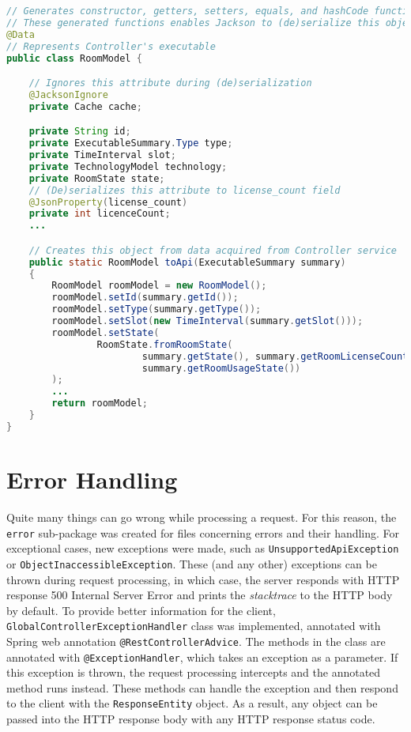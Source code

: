\begin{lstlisting}[language=java, caption=RoomModel.java, label=lst:model]
// Generates constructor, getters, setters, equals, and hashCode functions
// These generated functions enables Jackson to (de)serialize this object
@Data
// Represents Controller's executable
public class RoomModel {

    // Ignores this attribute during (de)serialization
    @JacksonIgnore
    private Cache cache;

    private String id;
    private ExecutableSummary.Type type;
    private TimeInterval slot;
    private TechnologyModel technology;
    private RoomState state;
    // (De)serializes this attribute to license_count field
    @JsonProperty(license_count)
    private int licenceCount;
    ...

    // Creates this object from data acquired from Controller service
    public static RoomModel toApi(ExecutableSummary summary)
    {
        RoomModel roomModel = new RoomModel();
        roomModel.setId(summary.getId());
        roomModel.setType(summary.getType());
        roomModel.setSlot(new TimeInterval(summary.getSlot()));
        roomModel.setState(
                RoomState.fromRoomState(
                        summary.getState(), summary.getRoomLicenseCount(),
                        summary.getRoomUsageState())
        );
        ...
        return roomModel;
    }
}
\end{lstlisting}


\section{Error Handling}
Quite many things can go wrong while processing a request. For this reason, the \texttt{error} sub-package was created for files concerning errors and their handling.
For exceptional cases, new exceptions were made, such as \texttt{UnsupportedApiException} or \texttt{ObjectInaccessibleException}.
These (and any other) exceptions can be thrown during request processing, in which case, the server responds with HTTP response 500 Internal Server Error and prints the \emph{stacktrace} to the HTTP body by default.
To provide better information for the client, \texttt{GlobalController\-ExceptionHandler} class was implemented, annotated with Spring web annotation \texttt{@RestControllerAdvice}.
The methods in the class are annotated with \texttt{@ExceptionHandler}, which takes an exception as a parameter. If this exception is thrown, the request processing intercepts and the annotated method runs instead.
These methods can handle the exception and then respond to the client with the \texttt{ResponseEntity} object. As a result, any object can be passed into the HTTP response body with any HTTP response status code.

